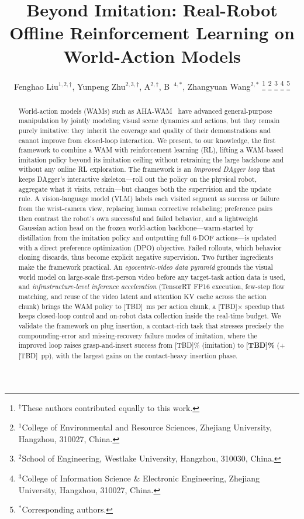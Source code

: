 \documentclass[letterpaper, 10pt, conference]{ieeeconf}
\title{Beyond Imitation: Real-Robot Offline Reinforcement Learning on World-Action Models}
\author{Fenghao Liu$^{1,2,\dagger}$, Yunpeng Zhu$^{2,3,\dagger}$, A$^{2,\dagger}$, B~$^{4,*}$, Zhangyuan Wang$^{2,*}$%
\thanks{$^{\dagger}$These authors contributed equally to this work.}%
\thanks{$^{1}$College of Environmental and Resource Sciences, Zhejiang University, Hangzhou, 310027, China.}%
\thanks{$^{2}$School of Engineering, Westlake University, Hangzhou, 310030, China.}%
\thanks{$^{3}$College of Information Science \& Electronic Engineering, Zhejiang University, Hangzhou, 310027, China.}%
\thanks{$^{*}$Corresponding authors.}%
}
\begin{document}
\maketitle
\thispagestyle{empty}
\pagestyle{empty}

\begin{abstract}
World-action models (WAMs) such as AHA-WAM~\cite{ahawam} have advanced general-purpose manipulation by jointly modeling visual scene dynamics and actions, but they remain purely imitative: they inherit the coverage and quality of their demonstrations and cannot improve from closed-loop interaction. We present, to our knowledge, the first framework to combine a WAM with reinforcement learning (RL), lifting a WAM-based imitation policy beyond its imitation ceiling without retraining the large backbone and without any online RL exploration. The framework is an \emph{improved DAgger loop} that keeps DAgger's interactive skeleton---roll out the policy on the physical robot, aggregate what it visits, retrain---but changes both the supervision and the update rule. A vision-language model (VLM) labels each visited segment as success or failure from the wrist-camera view, replacing human corrective relabeling; preference pairs then contrast the robot's own successful and failed behavior, and a lightweight Gaussian action head on the frozen world-action backbone---warm-started by distillation from the imitation policy and outputting full 6-DOF actions---is updated with a direct preference optimization (DPO) objective. Failed rollouts, which behavior cloning discards, thus become explicit negative supervision. Two further ingredients make the framework practical. An \emph{egocentric-video data pyramid} grounds the visual world model on large-scale first-person video before any target-task action data is used, and \emph{infrastructure-level inference acceleration} (TensorRT FP16 execution, few-step flow matching, and reuse of the video latent and attention KV cache across the action chunk) brings the WAM policy to [TBD]~ms per action chunk, a [TBD]$\times$ speedup that keeps closed-loop control and on-robot data collection inside the real-time budget. We validate the framework on plug insertion, a contact-rich task that stresses precisely the compounding-error and missing-recovery failure modes of imitation, where the improved loop raises grasp-and-insert success from [TBD]\% (imitation) to \textbf{[TBD]\%} ($+$[TBD]~pp), with the largest gains on the contact-heavy insertion phase.
\end{abstract}
\end{document}
